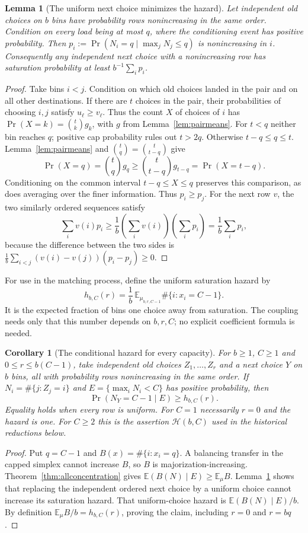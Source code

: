 \documentclass[11pt]{article}
\newtheorem{lemma}{Lemma}
\newtheorem{corollary}{Corollary}
\begin{document}
\begin{lemma}[The uniform next choice minimizes the hazard]\label{lem:nextuniform}
Let independent old choices on $b$ bins have probability rows
nonincreasing in the same order. Condition on every load being at
most $q$, where the conditioning event has positive probability.
Then $p_i:=\Pr(N_i=q\mid\max_jN_j\leq q)$ is nonincreasing in $i$.
Consequently any independent next choice with a nonincreasing row
has saturation probability at least $b^{-1}\sum_i p_i$.
\end{lemma}
\begin{proof}
Take bins $i<j$. Condition on which old choices landed in the pair
and on all other destinations. If there are $t$ choices in the pair,
their probabilities of choosing $i,j$ satisfy $u_\ell\geq v_\ell$.
Thus the count $X$ of choices of $i$ has
$\Pr(X=k)=\binom tk g_k$, with $g$ from Lemma~\ref{lem:pairmeans}.
For $t<q$ neither bin reaches $q$; positive cap probability rules out
$t>2q$. Otherwise $t-q\leq q\leq t$. Lemma~\ref{lem:pairmeans}
and $\binom tq=\binom t{t-q}$ give
\[
 \Pr(X=q)=\binom tq g_q\geq\binom t{t-q}g_{t-q}=\Pr(X=t-q).
\]
Conditioning on the common interval $t-q\leq X\leq q$ preserves
this comparison, as does averaging over the finer information.
Thus $p_i\geq p_j$. For the next row $v$, the two similarly ordered
sequences satisfy
\[
 \sum_i v(i)p_i\geq\frac1b\left(\sum_i v(i)\right)
                                  \left(\sum_i p_i\right)
 =\frac1b\sum_i p_i,
\]
because the difference between the two sides is
$\frac1b\sum_{i<j}(v(i)-v(j))(p_i-p_j)\geq0$.
\end{proof}

For use in the matching process, define the uniform saturation hazard by
\[
 h_{b,C}(r)=\frac1b\,
 \mathbb E_{\mu_{b,r,C-1}}\#\{i:x_i=C-1\}.
\]
It is the expected fraction of bins one choice away from saturation.
The coupling needs only that this number depends on $b,r,C$;
no explicit coefficient formula is needed.

\begin{corollary}[The conditional hazard for every capacity]\label{cor:allhazard}
For $b\geq1$, $C\geq1$ and $0\leq r\leq b(C-1)$, take independent
old choices $Z_1,\ldots,Z_r$ and a next choice $Y$ on $b$ bins,
all with probability rows nonincreasing in the same order. If
$N_i=\#\{j:Z_j=i\}$ and $E=\{\max_iN_i<C\}$ has positive probability,
then
\[
 \Pr(N_Y=C-1\mid E)\geq h_{b,C}(r).
\]
Equality holds when every row is uniform. For $C=1$ necessarily
$r=0$ and the hazard is one. For $C\geq2$ this is the assertion
$\mathcal H(b,C)$ used in the historical reductions below.
\end{corollary}
\begin{proof}
Put $q=C-1$ and $B(x)=\#\{i:x_i=q\}$. A balancing transfer in
the capped simplex cannot increase $B$, so $B$ is
majorization-increasing. Theorem~\ref{thm:allconcentration} gives
$\mathbb E(B(N)\mid E)\geq\mathbb E_\mu B$.
Lemma~\ref{lem:nextuniform} shows that replacing the independent ordered
next choice by a uniform choice cannot increase its saturation hazard.
That uniform-choice hazard is $\mathbb E(B(N)\mid E)/b$.
By definition $\mathbb E_\mu B/b=h_{b,C}(r)$, proving the claim,
including $r=0$ and $r=bq$.
\end{proof}
\end{document}
